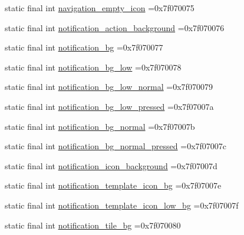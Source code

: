 \begin{DoxyCompactItemize}
\item 
static final int \mbox{\hyperlink{classcom_1_1example_1_1trainawearapplication_1_1_r_1_1drawable_a53762ad1a857391e1a16a5b0e43f1945}{navigation\+\_\+empty\+\_\+icon}} =0x7f070075
\item 
static final int \mbox{\hyperlink{classcom_1_1example_1_1trainawearapplication_1_1_r_1_1drawable_aa71b853bd5e99d95f545d98564047751}{notification\+\_\+action\+\_\+background}} =0x7f070076
\item 
static final int \mbox{\hyperlink{classcom_1_1example_1_1trainawearapplication_1_1_r_1_1drawable_af2336325049648b350c26bb8dc32abcb}{notification\+\_\+bg}} =0x7f070077
\item 
static final int \mbox{\hyperlink{classcom_1_1example_1_1trainawearapplication_1_1_r_1_1drawable_aa56749ca4e8c8be42298d421621a0697}{notification\+\_\+bg\+\_\+low}} =0x7f070078
\item 
static final int \mbox{\hyperlink{classcom_1_1example_1_1trainawearapplication_1_1_r_1_1drawable_aff787ebc46a8b5d605e25324f757b339}{notification\+\_\+bg\+\_\+low\+\_\+normal}} =0x7f070079
\item 
static final int \mbox{\hyperlink{classcom_1_1example_1_1trainawearapplication_1_1_r_1_1drawable_a887865514b4810d4c071946cccee51a5}{notification\+\_\+bg\+\_\+low\+\_\+pressed}} =0x7f07007a
\item 
static final int \mbox{\hyperlink{classcom_1_1example_1_1trainawearapplication_1_1_r_1_1drawable_a1e639d6e53d7496b811ff1d2e7e6fabb}{notification\+\_\+bg\+\_\+normal}} =0x7f07007b
\item 
static final int \mbox{\hyperlink{classcom_1_1example_1_1trainawearapplication_1_1_r_1_1drawable_a6bb72b5cf817b809340bf21f9d3b53d0}{notification\+\_\+bg\+\_\+normal\+\_\+pressed}} =0x7f07007c
\item 
static final int \mbox{\hyperlink{classcom_1_1example_1_1trainawearapplication_1_1_r_1_1drawable_a6e8ac46a3b07eefc925b68dfd9634cf0}{notification\+\_\+icon\+\_\+background}} =0x7f07007d
\item 
static final int \mbox{\hyperlink{classcom_1_1example_1_1trainawearapplication_1_1_r_1_1drawable_a183a8248577f6900fdf329334e87eb90}{notification\+\_\+template\+\_\+icon\+\_\+bg}} =0x7f07007e
\item 
static final int \mbox{\hyperlink{classcom_1_1example_1_1trainawearapplication_1_1_r_1_1drawable_ae2420b84d5f22b46b965c4e0c0a07ce4}{notification\+\_\+template\+\_\+icon\+\_\+low\+\_\+bg}} =0x7f07007f
\item 
static final int \mbox{\hyperlink{classcom_1_1example_1_1trainawearapplication_1_1_r_1_1drawable_ad4ad29a3fdf18ba02769dee59c47c7e9}{notification\+\_\+tile\+\_\+bg}} =0x7f070080

\end{DoxyCompactItemize}
